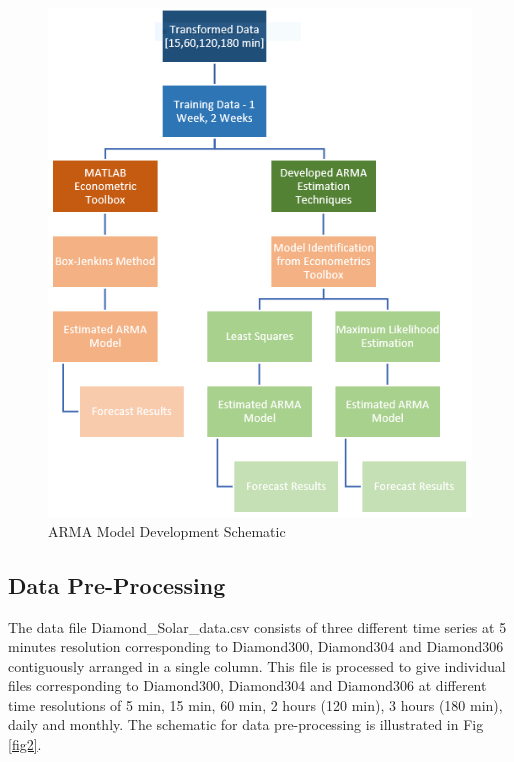 \documentclass[journal]{IEEEtran}
\begin{document}
\begin{figure}[H]
\centering
\includegraphics[scale=0.7]{ObjectivesSchematic.png}
\caption{ARMA Model Development Schematic}
\label{fig1} %
\end{figure}

\subsection{Data Pre-Processing}



The data file Diamond\_Solar\_data.csv consists of three different time series at 5 minutes resolution corresponding to Diamond300, Diamond304 and Diamond306 contiguously arranged in a single column. This file is processed to give individual files corresponding to Diamond300, Diamond304 and Diamond306 at different time resolutions of 5 min, 15 min, 60 min, 2 hours (120 min), 3 hours (180 min), daily and monthly. The schematic for data pre-processing is illustrated in Fig \ref{fig2}.
\end{document}
